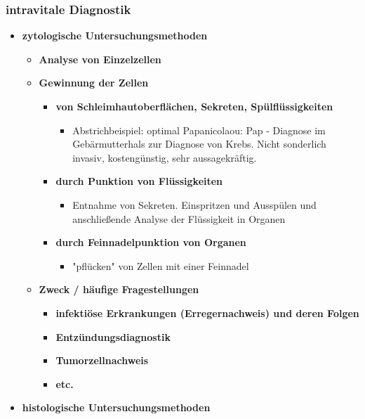 \subsubsection{intravitale Diagnostik}
	\begin{itemize}
		\item \textbf{zytologische Untersuchungsmethoden}
			\begin{itemize}
				\item \textbf{Analyse von Einzelzellen}
				\item \textbf{Gewinnung der Zellen}
					\begin{itemize}
						\item \textbf{von Schleimhautoberflächen, Sekreten, Spülflüssigkeiten}
							\begin{itemize}
								\item Abstrichbeispiel: optimal Papanicolaou: Pap - Diagnose im Gebärmutterhals zur Diagnose von Krebs. Nicht sonderlich invasiv, kostengünstig, sehr aussagekräftig.
							\end{itemize}
						\item \textbf{durch Punktion von Flüssigkeiten}
							\begin{itemize}
								\item Entnahme von Sekreten. Einspritzen und Ausspülen und anschließende Analyse der Flüssigkeit in Organen
							\end{itemize}
						\item \textbf{durch Feinnadelpunktion von Organen}
							\begin{itemize}
								\item "pflücken" von Zellen mit einer Feinnadel
							\end{itemize}
					\end{itemize}
				\item \textbf{Zweck / häufige Fragestellungen}
					\begin{itemize}
						\item \textbf{infektiöse Erkrankungen (Erregernachweis) und deren Folgen}
						\item \textbf{Entzündungsdiagnostik}
						\item \textbf{Tumorzellnachweis}
						\item \textbf{etc.}
					\end{itemize}
			\end{itemize}
\pagebreak
		\item \textbf{histologische Untersuchungsmethoden}
			\begin{itemize}

\end{itemize}
\end{itemize}
